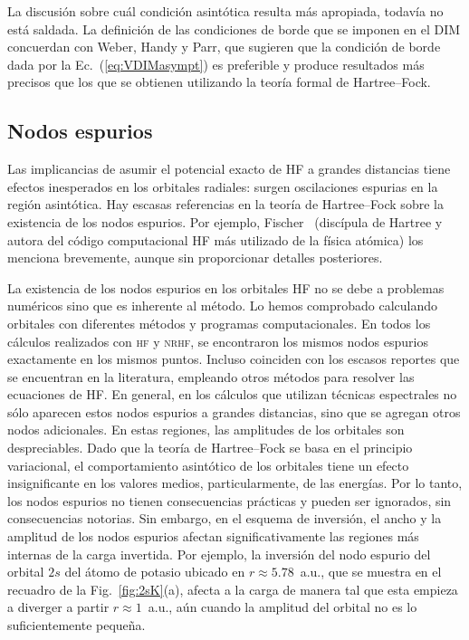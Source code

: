 La discusión sobre cuál condición asintótica resulta más apropiada, 
todavía no está saldada. La definición de las condiciones de borde que 
se imponen en el DIM concuerdan con Weber, Handy y Parr, que sugieren 
que la condición de borde dada por la Ec.~(\ref{eq:VDIMasympt}) es 
preferible y produce resultados más precisos que los que se obtienen 
utilizando la teoría formal de Hartree--Fock. 

\subsection{Nodos espurios}
\label{subsec:espuriosHF}

Las implicancias de asumir el potencial exacto de HF a grandes 
distancias tiene efectos inesperados en los orbitales radiales: surgen
oscilaciones espurias en la región asintótica. Hay escasas referencias 
en la teoría de Hartree--Fock sobre la existencia de los nodos espurios. 
Por ejemplo, Fischer~\cite{FroeseFischer:97} (discípula de Hartree y 
autora del código computacional HF más utilizado de la física atómica) 
los menciona brevemente, aunque sin proporcionar detalles posteriores. 

La existencia de los nodos espurios en los orbitales HF no se debe a 
problemas numéricos sino que es inherente al método. Lo hemos 
comprobado calculando orbitales con diferentes métodos y programas 
computacionales. En todos los cálculos realizados con \textsc{hf} y 
\textsc{nrhf}, se encontraron los mismos nodos espurios exactamente en 
los mismos puntos. Incluso coinciden con los escasos reportes que se 
encuentran en la literatura, empleando otros métodos para resolver las 
ecuaciones de HF. En general, en los cálculos que utilizan técnicas 
espectrales no sólo aparecen estos nodos espurios a grandes distancias, 
sino que se agregan otros nodos adicionales. En estas regiones, las 
amplitudes de los orbitales son despreciables. Dado que la teoría de 
Hartree--Fock se basa en el principio variacional, el comportamiento 
asintótico de los orbitales tiene un efecto insignificante en los 
valores medios, particularmente, de las energías. Por lo tanto, los 
nodos espurios no tienen consecuencias prácticas y pueden ser ignorados, 
sin consecuencias notorias. Sin embargo, en el esquema de inversión, el 
ancho y la amplitud de 
los nodos espurios afectan significativamente las regiones más internas 
de la carga invertida. Por ejemplo, la inversión del nodo espurio del 
orbital $2s$ del átomo de potasio ubicado en $r\approx 5.78$~a.u., que 
se muestra en el recuadro de la Fig.~\ref{fig:2sK}(a), afecta a la carga 
de manera tal que esta empieza a diverger a partir $r\approx 1$~a.u., 
aún cuando la amplitud del orbital no es lo suficientemente pequeña. 

